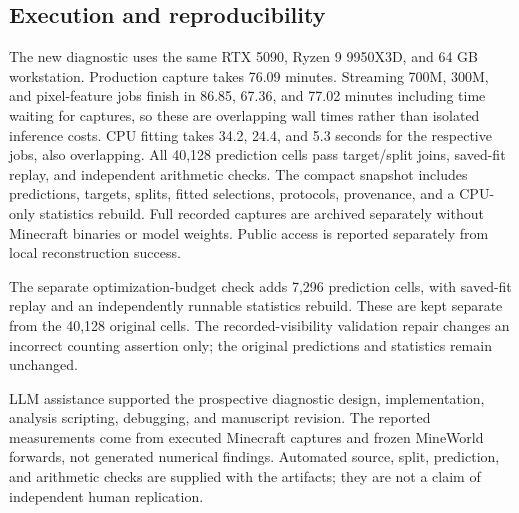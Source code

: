 \subsection{Execution and reproducibility}
The new diagnostic uses the same RTX 5090, Ryzen 9 9950X3D, and 64 GB workstation. Production capture takes 76.09 minutes. Streaming 700M, 300M, and pixel-feature jobs finish in 86.85, 67.36, and 77.02 minutes including time waiting for captures, so these are overlapping wall times rather than isolated inference costs. CPU fitting takes 34.2, 24.4, and 5.3 seconds for the respective jobs, also overlapping. All 40,128 prediction cells pass target/split joins, saved-fit replay, and independent arithmetic checks. The compact snapshot includes predictions, targets, splits, fitted selections, protocols, provenance, and a CPU-only statistics rebuild. Full recorded captures are archived separately without Minecraft binaries or model weights. Public access is reported separately from local reconstruction success.

The separate optimization-budget check adds 7,296 prediction cells, with saved-fit replay and an independently runnable statistics rebuild. These are kept separate from the 40,128 original cells. The recorded-visibility validation repair changes an incorrect counting assertion only; the original predictions and statistics remain unchanged.

LLM assistance supported the prospective diagnostic design, implementation, analysis scripting, debugging, and manuscript revision. The reported measurements come from executed Minecraft captures and frozen MineWorld forwards, not generated numerical findings. Automated source, split, prediction, and arithmetic checks are supplied with the artifacts; they are not a claim of independent human replication.

